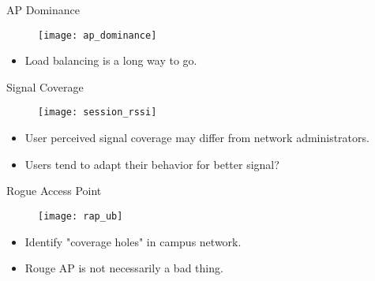 \begin{frame}{AP Dominance}
  \begin{figure}
    \centering
    \texttt{[image: ap\_dominance]}
  \end{figure}
  \begin{itemize}
    \item Load balancing is a long way to go.
  \end{itemize}
\end{frame}

\begin{frame}{Signal Coverage}
  \begin{figure}
    \centering
    \texttt{[image: session\_rssi]}
  \end{figure}
  \begin{itemize}
    \item User perceived signal coverage may differ from network administrators.
    \item Users tend to adapt their behavior for better signal?
  \end{itemize}
\end{frame}

\begin{frame}{Rogue Access Point}
  \begin{figure}
    \centering
    \texttt{[image: rap\_ub]}
  \end{figure}
  \begin{itemize}
    \item Identify "coverage holes" in campus network.
    \item Rouge AP is not necessarily a bad thing.
  \end{itemize}
\end{frame}
